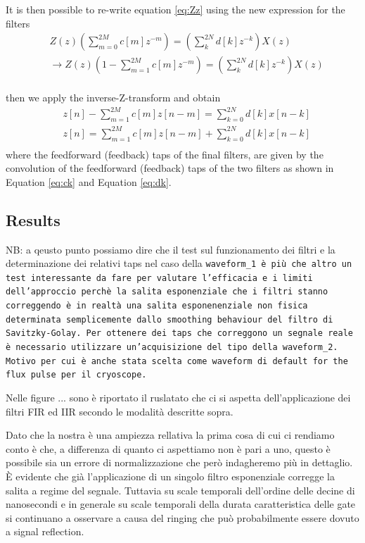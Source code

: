 It is then possible to re-write equation \ref{eq:Zz} using the new expression for the filters
\begin{align}
    & Z(z)\left( \sum_{m=0}^{2M} c[m]z^{-m} \right) = \left( \sum_{k}^{2N} d[k]z^{-k} \right)X(z)\\
    & \rightarrow Z(z)\left(1 - \sum_{m=1}^{2M} c[m]z^{-m} \right) = \left( \sum_{k}^{2N} d[k]z^{-k} \right)X(z)\\ \label{eq:z_final}
\end{align} 

then we apply the inverse-Z-transform and obtain
\begin{align}
    & z[n] - \sum_{m=1}^{2M} c[m]z[n-m] = \sum_{k=0}^{2N} d[k] x[n-k]\\
    & z[n] = \sum_{m=1}^{2M} c[m]z[n-m] + \sum_{k=0}^{2N} d[k] x[n-k]\\
\end{align}
where the feedforward (feedback) taps of the final filters, are given by the convolution of the feedforward (feedback) taps of the two filters as shown in Equation \ref{eq:ck} and Equation \ref{eq:dk}.

\subsection{Results}

NB: a qeusto punto possiamo dire che il test sul funzionamento dei filtri e la determinazione dei relativi taps nel caso della \tt{waveform\_1} è più che altro un test interessante da fare per valutare l'efficacia e i limiti dell'approccio perchè la salita esponenziale che i filtri stanno correggendo è in realtà una salita esponenenziale non fisica determinata semplicemente dallo smoothing behaviour del filtro di Savitzky-Golay.
Per ottenere dei taps che correggono un segnale reale è necessario utilizzare un'acquisizione del tipo della \tt{waveform\_2}. 
Motivo per cui è anche stata scelta come waveform di default for the flux pulse per il cryoscope.

Nelle figure ... sono è riportato il ruslatato che ci si aspetta dell'applicazione dei filtri FIR ed IIR secondo le modalità descritte sopra.

Dato che la nostra è una ampiezza rellativa la prima cosa di cui ci rendiamo conto è che, a differenza di quanto ci aspettiamo non è pari a uno, questo è possibile sia un errore di normalizzazione che però indagheremo più in dettaglio.
È evidente che già l'applicazione di un singolo filtro esponenziale corregge la salita a regime del segnale.
Tuttavia su scale temporali dell'ordine delle decine di nanosecondi e in generale su scale temporali della durata caratteristica delle gate si continuano a osservare a causa del ringing che può probabilmente essere dovuto a signal reflection.

